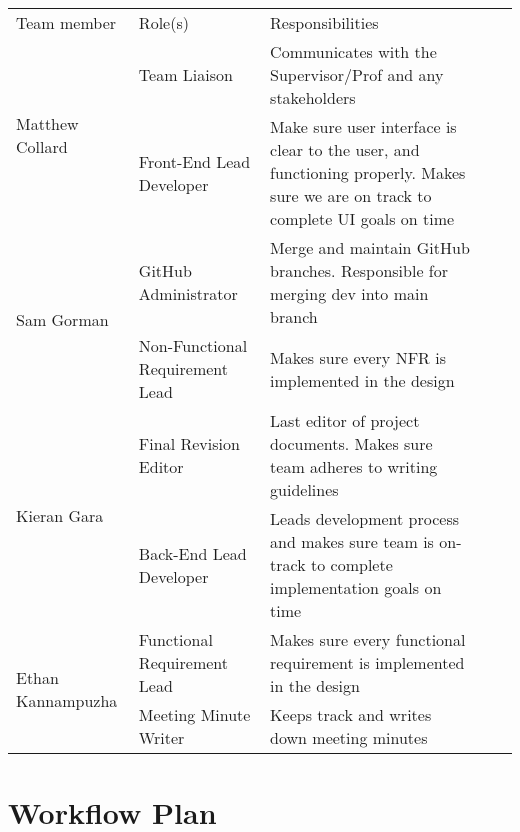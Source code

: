 \documentclass{article}
\begin{document}
\begin{table}[h]
\centering
\begin{tabular}{|p{1.3in}|p{2in}|p{2.6in}|ll}
\cline{1-3}
Team member& Role(s)& Responsibilities &  &  \\ \cline{1-3}
\multirow{2}{*}{Matthew Collard}   & Team Liaison & Communicates with the Supervisor/Prof and any stakeholders &  &  \\ \cline{2-3} & Front-End Lead Developer & Make sure user interface is clear to the user, and functioning properly. Makes sure we are on track to complete UI goals on time &  &  \\ \cline{1-3}
\multirow{2}{*}{Sam Gorman} & GitHub Administrator & Merge and maintain GitHub branches. Responsible for merging dev into main branch  &  &  \\ \cline{2-3} & Non-Functional Requirement Lead & Makes sure every NFR is implemented in the design &  &  \\ \cline{1-3}
\multirow{2}{*}{Kieran Gara}  & Final Revision Editor  & Last editor of project documents. Makes sure team adheres to writing guidelines   &  &  \\ \cline{2-3}& Back-End Lead Developer  & Leads development process and makes sure team is on-track to complete implementation goals on time  &  &  \\ \cline{1-3}
\multirow{2}{*}{Ethan Kannampuzha} & Functional Requirement Lead     & Makes sure every functional requirement is implemented in the design &  &  \\ \cline{2-3} & Meeting Minute Writer & Keeps track and writes down meeting minutes &  &  \\ \cline{1-3}
\end{tabular}
\end{table}



\section{Workflow Plan}
\end{document}
